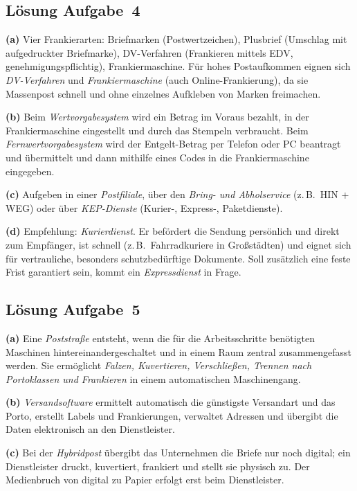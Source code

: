 \documentclass[11pt, a4paper]{article}
\begin{document}
\subsection*{Lösung Aufgabe~4}
\begin{loesung}
\textbf{(a)} Vier Frankierarten: Briefmarken (Postwertzeichen), Plusbrief (Umschlag mit
aufgedruckter Briefmarke), DV-Verfahren (Frankieren mittels EDV, genehmigungspflichtig),
Frankiermaschine. Für hohes Postaufkommen eignen sich \emph{DV-Verfahren} und
\emph{Frankiermaschine} (auch Online-Frankierung), da sie Massenpost schnell und ohne
einzelnes Aufkleben von Marken freimachen.

\textbf{(b)} Beim \emph{Wertvorgabesystem} wird ein Betrag im Voraus bezahlt, in der
Frankiermaschine eingestellt und durch das Stempeln verbraucht. Beim
\emph{Fernwertvorgabesystem} wird der Entgelt-Betrag per Telefon oder PC beantragt und
übermittelt und dann mithilfe eines Codes in die Frankiermaschine eingegeben.

\textbf{(c)} Aufgeben in einer \emph{Postfiliale}, über den \emph{Bring- und
Abholservice} (z.\,B.\ HIN + WEG) oder über \emph{KEP-Dienste} (Kurier-, Express-,
Paketdienste).

\textbf{(d)} Empfehlung: \emph{Kurierdienst}. Er befördert die Sendung persönlich und
direkt zum Empfänger, ist schnell (z.\,B.\ Fahrradkuriere in Großstädten) und eignet sich
für vertrauliche, besonders schutzbedürftige Dokumente. Soll zusätzlich eine feste Frist
garantiert sein, kommt ein \emph{Expressdienst} in Frage.
\end{loesung}

\subsection*{Lösung Aufgabe~5}
\begin{loesung}
\textbf{(a)} Eine \emph{Poststraße} entsteht, wenn die für die Arbeitsschritte benötigten
Maschinen hintereinandergeschaltet und in einem Raum zentral zusammengefasst werden. Sie
ermöglicht \emph{Falzen, Kuvertieren, Verschließen, Trennen nach Portoklassen und
Frankieren} in einem automatischen Maschinengang.

\textbf{(b)} \emph{Versandsoftware} ermittelt automatisch die günstigste Versandart und
das Porto, erstellt Labels und Frankierungen, verwaltet Adressen und übergibt die Daten
elektronisch an den Dienstleister.

\textbf{(c)} Bei der \emph{Hybridpost} übergibt das Unternehmen die Briefe nur noch
digital; ein Dienstleister druckt, kuvertiert, frankiert und stellt sie physisch zu. Der
Medienbruch von digital zu Papier erfolgt erst beim Dienstleister.
\end{loesung}
\end{document}
